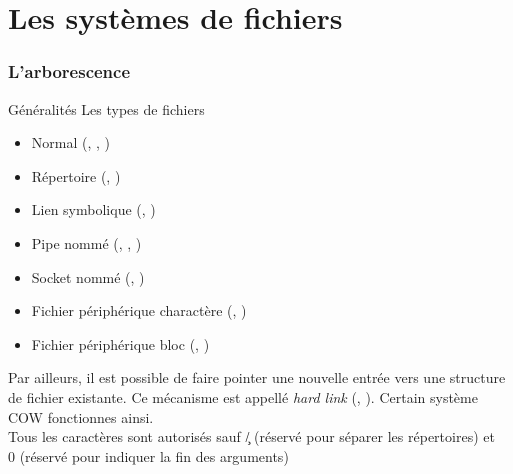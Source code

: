 %
%
%

\part{Les systèmes de fichiers}

\begin{frame}
  \partpage
\end{frame}

\begin{frame}
  \tableofcontents[currentpart]
\end{frame}

\section{L'arborescence}

\begin{frame}[fragile=singleslide]{Généralités}
  Les types de fichiers
  \begin{itemize}
  \item Normal (, , )
  \item Répertoire (, )
  \item Lien symbolique (, )
  \item Pipe nommé (, , )
  \item Socket nommé (, )
  \item     Fichier    périphérique     charactère    (,
    )
  \item Fichier périphérique bloc (, )
  \end{itemize}

  Par ailleurs, il  est possible de faire pointer  une nouvelle entrée
  vers une  structure de fichier existante.  Ce  mécanisme est appellé
  \emph{hard link}  (, ). Certain  système COW
  fonctionnes ainsi.
  \\
  Tous les caractères sont  autorisés sauf \c{/} (réservé pour séparer
  les  répertoires)  et \c{\\0}  (réservé  pour  indiquer  la fin  des
  arguments)
\end{frame}

